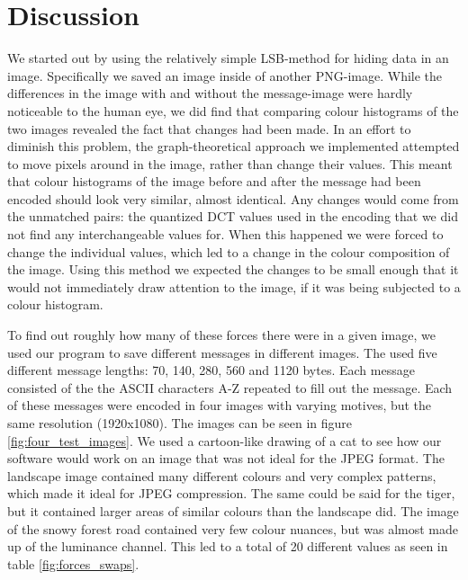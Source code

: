 \section{Discussion}
We started out by using the relatively simple LSB-method for hiding data in an image.
Specifically we saved an image inside of another PNG-image.
While the differences in the image with and without the message-image were hardly noticeable to the human eye, we did find that comparing colour histograms of the two images revealed the fact that changes had been made.
In an effort to diminish this problem, the graph-theoretical approach we implemented attempted to move pixels around in the image, rather than change their values.
This meant that colour histograms of the image before and after the message had been encoded should look very similar, almost identical.
Any changes would come from the unmatched pairs: the quantized DCT values used in the encoding that we did not find any interchangeable values for.
When this happened we were forced to change the individual values, which led to a change in the colour composition of the image.
Using this method we expected the changes to be small enough that it would not immediately draw attention to the image, if it was being subjected to a colour histogram.

To find out roughly how many of these forces there were in a given image, we used our program to save different messages in different images.
The used five different message lengths: 70, 140, 280, 560 and 1120 bytes.
Each message consisted of the the ASCII characters A-Z repeated to fill out the message.
Each of these messages were encoded in four images with varying motives, but the same resolution (1920x1080).
The images can be seen in figure \ref{fig:four_test_images}.
We used a cartoon-like drawing of a cat to see how our software would work on an image that was not ideal for the JPEG format.
The landscape image contained many different colours and very complex patterns, which made it ideal for JPEG compression.
The same could be said for the tiger, but it contained larger areas of similar colours than the landscape did.
The image of the snowy forest road contained very few colour nuances, but was almost made up of the luminance channel.
This led to a total of 20 different values as seen in table \ref{fig:forces_swaps}.


